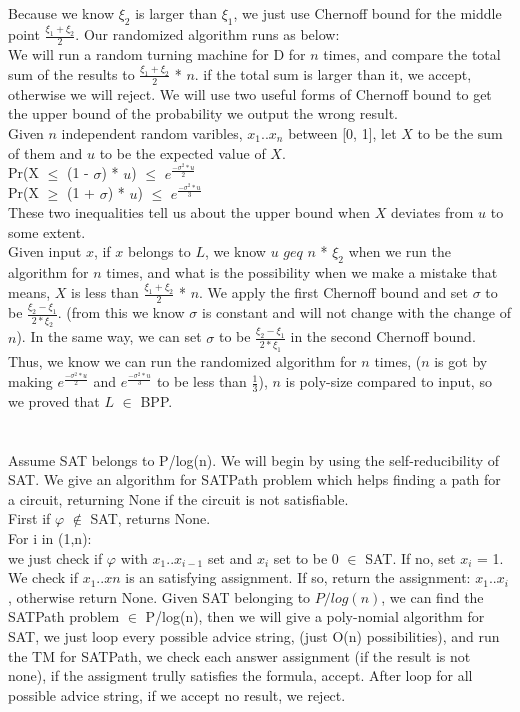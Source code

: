 \documentclass[11pt]{article}
\begin{document}
\part{} 
Because we know $\xi_{2}$ is larger than $\xi_{1}$, we just use Chernoff bound for the middle point $\frac{\xi_{1} + \xi_{2}}{2}$.
Our randomized algorithm runs as below: \\
We will run a random turning machine for D for $n$ times, and compare the total sum of the results to $\frac{\xi_{1} + \xi_{2}}{2}$ * $n$. if the total sum is larger than it, we accept, otherwise we will reject. We will use two useful forms of Chernoff bound to get the upper bound of the probability we output the wrong result. \\
Given $n$ independent random varibles, $x_{1}$..$x_{n}$ between [0, 1], let $X$ to be the sum of them and $u$ to be the expected value of $X$. \\
Pr(X $\leq$ (1 - $\sigma$) * $u$) $\leq$ $e^{\frac{-\sigma^{2}*u}{2}}$ \\
Pr(X $\geq$ (1 + $\sigma$) * $u$) $\leq$ $e^{\frac{-\sigma^{2}*u}{3}}$ \\
These two inequalities tell us about the upper bound when $X$ deviates from $u$ to some extent. \\
Given input $x$, if $x$ belongs to $L$, we know $u$ $geq$ $n$ * $\xi_{2}$ when we run the algorithm for $n$ times, and what is the possibility when we make a mistake that means, $X$ is less than $\frac{\xi_{1} + \xi_{2}}{2}$ * $n$. We apply the first Chernoff bound and set $\sigma$ to be $\frac{\xi_{2} - \xi_{1}}{2*\xi_{2}}$. (from this we know $\sigma$ is constant and will not change with the change of $n$). In the same way, we can set $\sigma$ to be $\frac{\xi_{2} - \xi_{1}}{2*\xi_{1}}$ in the second Chernoff bound. Thus, we know we can run the randomized algorithm for $n$ times, ($n$ is got by making $e^{\frac{-\sigma^{2}*u}{2}}$ and $e^{\frac{-\sigma^{2}*u}{3}}$ to be less than $\frac{1}{3}$), $n$ is poly-size compared to input, so we proved that $L$ $\in$ BPP.
\part{}
Assume SAT belongs to P/log(n). We will begin by using the self-reducibility of SAT. We give an algorithm for SATPath problem which helps finding a path for a circuit, returning None if the circuit is not satisfiable.\\
First if $\varphi$ $\notin$ SAT, returns None. \\
For i in (1,n): \\
	we just check if $\varphi$ with $x_{1}..x_{i-1}$ set and $x_{i}$ set to be 0 $\in$ SAT. If no, set $x_{i}$ = 1. \\
We check if $x_{1}..x{n}$ is an satisfying assignment.
If so, return the assignment: $x_{1}..x_{i}$, otherwise return None.
Given SAT belonging to $P/log(n)$, we can find the SATPath problem $\in$ P/log(n), then we will give a poly-nomial algorithm for SAT, we just loop every possible advice string, (just O(n) possibilities), and run the TM for SATPath, we check each answer assignment (if the result is not none), if the assigment trully satisfies the formula, accept. After loop for all possible advice string, if we accept no result, we reject.
\end{document}
